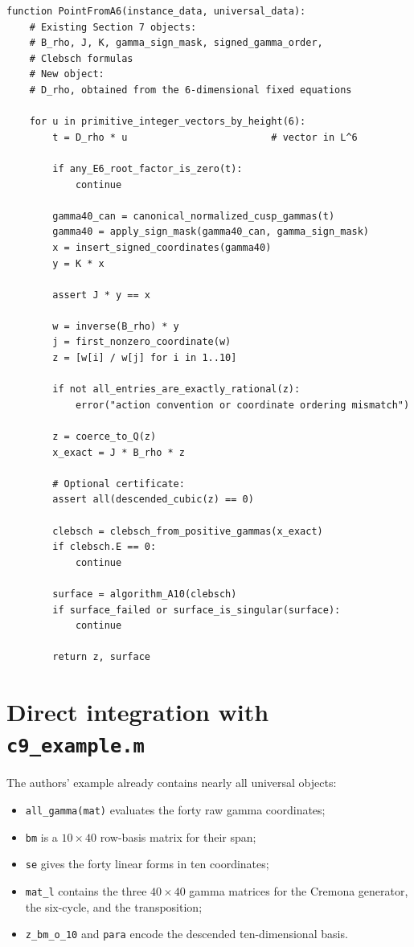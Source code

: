 \documentclass[11pt]{article}
\begin{document}
\begin{lstlisting}
function PointFromA6(instance_data, universal_data):
    # Existing Section 7 objects:
    # B_rho, J, K, gamma_sign_mask, signed_gamma_order,
    # Clebsch formulas
    # New object:
    # D_rho, obtained from the 6-dimensional fixed equations

    for u in primitive_integer_vectors_by_height(6):
        t = D_rho * u                         # vector in L^6

        if any_E6_root_factor_is_zero(t):
            continue

        gamma40_can = canonical_normalized_cusp_gammas(t)
        gamma40 = apply_sign_mask(gamma40_can, gamma_sign_mask)
        x = insert_signed_coordinates(gamma40)
        y = K * x

        assert J * y == x

        w = inverse(B_rho) * y
        j = first_nonzero_coordinate(w)
        z = [w[i] / w[j] for i in 1..10]

        if not all_entries_are_exactly_rational(z):
            error("action convention or coordinate ordering mismatch")

        z = coerce_to_Q(z)
        x_exact = J * B_rho * z

        # Optional certificate:
        assert all(descended_cubic(z) == 0)

        clebsch = clebsch_from_positive_gammas(x_exact)
        if clebsch.E == 0:
            continue

        surface = algorithm_A10(clebsch)
        if surface_failed or surface_is_singular(surface):
            continue

        return z, surface
\end{lstlisting}

\section{Direct integration with \texttt{c9\_example.m}}
\label{sec:magma-integration}

The authors' example already contains nearly all universal objects:

\begin{itemize}
\item \texttt{all\_gamma(mat)} evaluates the forty raw gamma coordinates;
\item \texttt{bm} is a $10\times40$ row-basis matrix for their span;
\item \texttt{se} gives the forty linear forms in ten coordinates;
\item \texttt{mat\_l} contains the three $40\times40$ gamma matrices for the
Cremona generator, the six-cycle, and the transposition;
\item \texttt{z\_bm\_o\_10} and \texttt{para} encode the descended ten-dimensional
basis.
\end{itemize}
\end{document}
